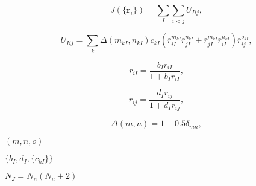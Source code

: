 \documentclass{article}
\begin{document}
\begin{equation} J(\{\textbf{r}_i\})=\sum_I\sum_{i<j}U_{Iij}, \end{equation}
\pagebreak

\begin{equation} U_{Iij} = \sum_k \Delta(m_{kI},n_{kI})c_{kI}(\bar{r}_{iI}^{m_{kI}}\bar{r}_{jI}^{n_{kI}}+\bar{r}_{jI}^{m_{kI}}\bar{r}_{iI}^{n_{kI}})\bar{r}_{ij}^{o_{kI}}, \end{equation}
\pagebreak

\begin{equation} \bar{r}_{iI} =\frac{b_Ir_{iI}}{1+b_{I}r_{iI}}, \end{equation}
\pagebreak

\begin{equation} \bar{r}_{ij}=\frac{d_Ir_{ij}}{1+d_{I}r_{ij}}, \end{equation}
\pagebreak

\begin{equation} \Delta(m,n)=1-0.5\delta_{mn}, \end{equation}
\pagebreak

$(m,n,o)$
\pagebreak

$\{b_I,d_I,\{c_{kI}\}\}$
\pagebreak

$N_J=N_n(N_u+2)$
\pagebreak
\end{document}
